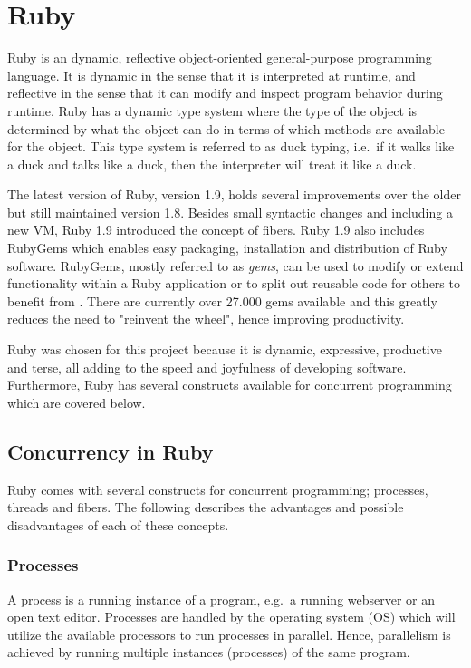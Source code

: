 \section{Ruby} %
\label{sec:ruby}

Ruby is an dynamic, reflective object-oriented general-purpose programming
language. It is dynamic in the sense that it is interpreted at runtime, and
reflective in the sense that it can modify and inspect program behavior during
runtime.  Ruby has a dynamic type system where the type of the object is
determined by what the object can do in terms of which methods are available
for the object. This type system is referred to as duck typing, i.e.\ if it
walks like a duck and talks like a duck, then the interpreter will treat it
like a duck.

The latest version of Ruby, version 1.9, holds several improvements over the
older but still maintained version 1.8. Besides small syntactic changes and
including a new VM, Ruby 1.9 introduced the concept of fibers. Ruby 1.9 also
includes RubyGems which enables easy packaging, installation and distribution
of Ruby software. RubyGems, mostly referred to as \textit{gems}, can be used
to modify or extend functionality within a Ruby application or to split out
reusable code for others to benefit from \cite{rubygems}. There are currently
over 27.000 gems available and this greatly reduces the need to "reinvent the
wheel", hence improving productivity. 

Ruby was chosen for this project because it is dynamic, expressive, productive
and terse, all adding to the speed and joyfulness of developing software.
Furthermore, Ruby has several constructs available for concurrent programming
which are covered below.

\subsection{Concurrency in Ruby}
Ruby comes with several constructs for concurrent programming; processes, threads
and fibers. The following describes the advantages and possible disadvantages
of each of these concepts.

\subsubsection{Processes}
A process is a running instance of a program, e.g.\ a running webserver or an
open text editor. Processes are handled by the operating system (OS) which
will utilize the available processors to run processes in parallel.
Hence, parallelism is achieved by running multiple instances (processes) of
the same program.

